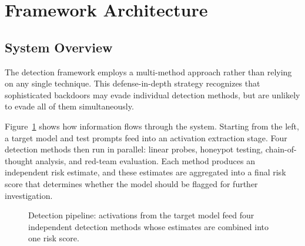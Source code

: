 \documentclass[11pt,letterpaper]{article}
\let\origsubsection\subsection
\renewcommand{\subsection}{\needspace{8\baselineskip}\origsubsection}}
\begin{document}
\section{Framework Architecture}
\label{sec:arch}

\subsection{System Overview}

The detection framework employs a multi-method approach rather than relying on any single technique. This defense-in-depth strategy recognizes that sophisticated backdoors may evade individual detection methods, but are unlikely to evade all of them simultaneously.

Figure~\ref{fig:architecture} shows how information flows through the system. Starting from the left, a target model and test prompts feed into an activation extraction stage. Four detection methods then run in parallel: linear probes, honeypot testing, chain-of-thought analysis, and red-team evaluation. Each method produces an independent risk estimate, and these estimates are aggregated into a final risk score that determines whether the model should be flagged for further investigation.

\begin{figure}[!htbp]
\centering
{}
\caption{Detection pipeline: activations from the target model feed four independent detection methods whose estimates are combined into one risk score.}
\label{fig:architecture}
\end{figure}
\end{document}
